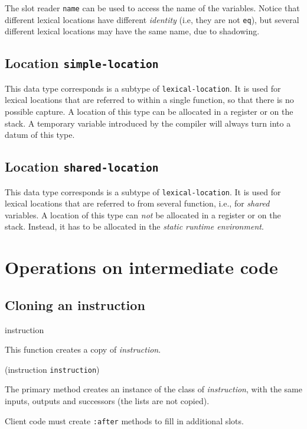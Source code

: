 The slot reader \texttt{name} can be used to access the name of the
variables.  Notice that different lexical locations have different
\emph{identity} (i.e, they are not \texttt{eq}), but several different
lexical locations may have the same name, due to shadowing.

\subsection{Location \texttt{simple-location}}

This data type corresponds is a subtype of \texttt{lexical-location}.
It is used for lexical locations that are referred to within a single
function, so that there is no possible capture.  A location of this
type can be allocated in a register or on the stack.  A temporary
variable introduced by the compiler will always turn into a datum of
this type.

\subsection{Location \texttt{shared-location}}

This data type corresponds is a subtype of \texttt{lexical-location}.
It is used for lexical locations that are referred to from several
function, i.e., for \emph{shared} variables.  A location of this
type can \emph{not} be allocated in a register or on the stack.
Instead, it has to be allocated in the \emph{static runtime
  environment}. 

\section{Operations on intermediate code}

\subsection{Cloning an instruction}

 {instruction}

This function creates a copy of \textit{instruction}.

 {(instruction {\tt instruction})}

The primary method creates an instance of the class of
\textit{instruction}, with the same inputs, outputs and successors
(the lists are not copied). 

Client code must create \texttt{:after} methods to fill in additional
slots. 

